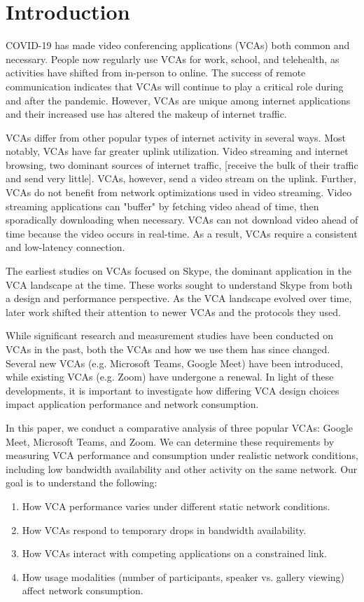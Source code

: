 \section{Introduction}\label{sec:intro}
COVID-19 has made video conferencing applications (VCAs) both common and necessary. People now regularly use VCAs for work, school, and telehealth, as activities have shifted from in-person to online. The success of remote communication indicates that VCAs will continue to play a critical role during and after the pandemic. However, VCAs are unique among internet applications and their increased use has altered the makeup of internet traffic. 

VCAs differ from other popular types of internet activity in several ways. Most notably, VCAs have far greater uplink utilization. Video streaming and internet browsing, two dominant sources of internet traffic, [receive the bulk of their traffic and send very little]. VCAs, however, send a video stream on the uplink. Further, VCAs do not benefit from network optimizations used in video streaming. Video streaming applications can "buffer" by fetching video ahead of time, then sporadically downloading when necessary. VCAs can not download video ahead of time because the video occurs in real-time. As a result, VCAs require a consistent and low-latency connection.

The earliest studies on VCAs focused on Skype, the dominant application in the VCA landscape at the time. These works sought to understand Skype from both a design and performance perspective. As the VCA landscape evolved over time, later work shifted their attention to newer VCAs and the protocols they used. 

While significant research and measurement studies have been conducted on VCAs in the past, both the VCAs and how we use them has since changed. Several new VCAs (e.g. Microsoft Teams, Google Meet) have been introduced, while existing VCAs (e.g. Zoom) have undergone a renewal. In light of these developments, it is important to investigate how differing VCA design choices impact application performance and network consumption. 


 In this paper, we conduct a comparative analysis of three popular VCAs: Google Meet, Microsoft Teams, and Zoom. We can determine these requirements by measuring VCA performance and consumption under realistic network conditions, including low bandwidth availability and other activity on the same network. Our goal is to understand the following:
\begin{enumerate}
    \item How VCA performance varies under different static network conditions.
    \item How VCAs respond to temporary drops in bandwidth availability.
    \item How VCAs interact with competing applications on a constrained link.
    \item How usage modalities (number of participants, speaker vs. gallery viewing) affect network consumption.
\end{enumerate}

